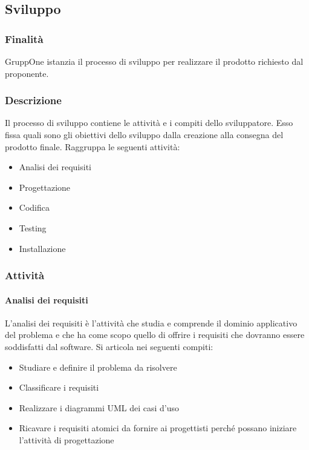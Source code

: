 \documentclass[../norme-di-progetto.tex]{subfiles}
\begin{document}
\subsection{Sviluppo}%
\label{sub:sviluppo}

\subsubsection{Finalità}%
\label{subs:sviluppo/finalita}

GruppOne istanzia il processo di sviluppo per realizzare il prodotto richiesto dal proponente.

\subsubsection{Descrizione}%
\label{subs:sviluppo/descrizione}

Il processo di sviluppo contiene le attività e i compiti dello sviluppatore. Esso fissa quali sono gli obiettivi dello sviluppo dalla creazione alla consegna del prodotto finale. Raggruppa le seguenti attività:

\begin{itemize}
  \item Analisi dei requisiti
  \item Progettazione
  \item Codifica
  \item Testing
  \item Installazione
\end{itemize}

\subsubsection{Attività}%
\label{subs:sviluppo/attivita}

\paragraph{Analisi dei requisiti}%
\label{par:analisi_dei_requisiti}
L'analisi dei requisiti è l'attività che studia e comprende il dominio applicativo del problema e che ha come scopo quello di offrire i requisiti che dovranno essere soddisfatti dal software. Si articola nei seguenti compiti:

\begin{itemize}
  \item Studiare e definire il problema da risolvere
  \item Classificare i requisiti
  \item Realizzare i diagrammi UML dei casi d'uso
  \item Ricavare i requisiti atomici da fornire ai progettisti perché possano iniziare l'attività di progettazione
\end{itemize}
\end{document}
